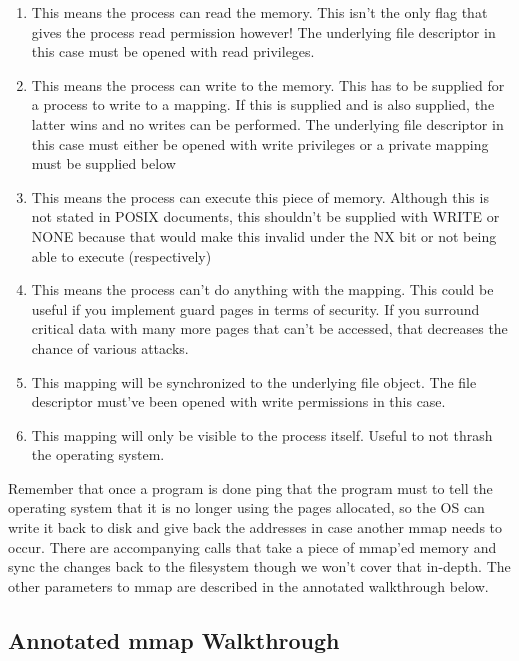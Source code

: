 \begin{enumerate}
\item {} This means the process can read the memory. This isn't the only flag that gives the process read permission however! The underlying file descriptor in this case must be opened with read privileges.
\item {} This means the process can write to the memory. This has to be supplied for a process to write to a mapping. If this is supplied and  is also supplied, the latter wins and no writes can be performed. The underlying file descriptor in this case must either be opened with write privileges or a private mapping must be supplied below
\item {} This means the process can execute this piece of memory. Although this is not stated in POSIX documents, this shouldn't be supplied with WRITE or NONE because that would make this invalid under the NX bit or not being able to execute (respectively)
\item {} This means the process can't do anything with the mapping. This could be useful if you implement guard pages in terms of security. If you surround critical data with many more pages that can't be accessed, that decreases the chance of various attacks.
\item {} This mapping will be synchronized to the underlying file object. The file descriptor must've been opened with write permissions in this case.
\item {} This mapping will only be visible to the process itself. Useful to not thrash the operating system.
\end{enumerate}

Remember that once a program is done ping that the program must  to tell the operating system that it is no longer using the pages allocated, so the OS can write it back to disk and give back the addresses in case another mmap needs to occur.
There are accompanying calls  that take a piece of mmap'ed memory and sync the changes back to the filesystem though we won't cover that in-depth.
The other parameters to mmap are described in the annotated walkthrough below.

\subsection{Annotated mmap Walkthrough}

